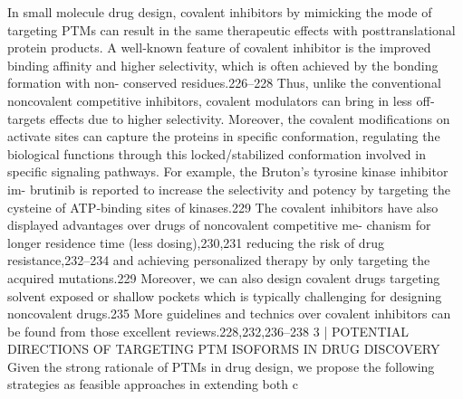 In small molecule drug design, covalent inhibitors by mimicking the mode of targeting PTMs can result in the
same therapeutic effects with posttranslational protein products. A well‐known feature of covalent inhibitor is the
improved binding affinity and higher selectivity, which is often achieved by the bonding formation with non-
conserved residues.226–228 Thus, unlike the conventional noncovalent competitive inhibitors, covalent modulators
can bring in less off‐targets effects due to higher selectivity. Moreover, the covalent modifications on activate sites
can capture the proteins in specific conformation, regulating the biological functions through this locked/stabilized
conformation involved in specific signaling pathways. For example, the Bruton's tyrosine kinase inhibitor im-
brutinib is reported to increase the selectivity and potency by targeting the cysteine of ATP‐binding sites of
kinases.229 The covalent inhibitors have also displayed advantages over drugs of noncovalent competitive me-
chanism for longer residence time (less dosing),230,231 reducing the risk of drug resistance,232–234 and achieving
personalized therapy by only targeting the acquired mutations.229 Moreover, we can also design covalent drugs
targeting solvent exposed or shallow pockets which is typically challenging for designing noncovalent drugs.235
More guidelines and technics over covalent inhibitors can be found from those excellent reviews.228,232,236–238
3
|
POTENTIAL DIRECTIONS OF TARGETING PTM ISOFORMS IN DRUG
DISCOVERY
Given the strong rationale of PTMs in drug design, we propose the following strategies as feasible approaches in
extending both c

